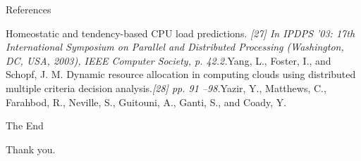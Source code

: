 \begin{frame}[allowframebreaks]{References}
\begin{thebibliography}{2}
{\beamertemplatearticlebibitems {} Homeostatic and tendency-based CPU load predictions. \newblock\emph{[27] In IPDPS ’03: 17th International Symposium on Parallel and Distributed Processing (Washington, DC, USA, 2003), IEEE Computer Society, p. 42.2.}\newblock Yang, L., Foster, I., and Schopf, J. M. 
\beamertemplatearticlebibitems {} Dynamic resource allocation in computing clouds using distributed multiple criteria decision analysis.\newblock\emph{[28]  pp. 91 –98.}\newblock Yazir, Y., Matthews, C., Farahbod, R., Neville, S., Guitouni, A., Ganti, S., and Coady, Y.

}
\end{thebibliography}

\end{frame}

\begin{frame}{The End}
\begin{center}
Thank you.
\end{center}
\end{frame}


